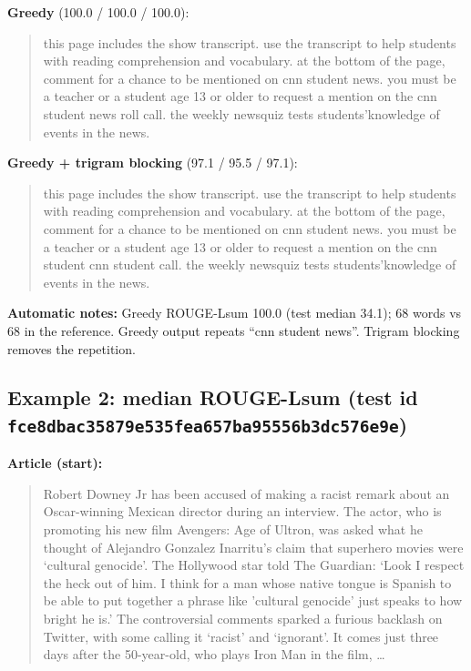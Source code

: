 \documentclass[10pt,a4paper]{article}
\begin{document}
\textbf{Greedy} (100.0 / 100.0 / 100.0):

\begin{quote}
this page includes the show transcript.
use the transcript to help students with reading comprehension and vocabulary.
at the bottom of the page, comment for a chance to be mentioned on cnn student news. you must be a teacher or a student age 13 or older to request a mention on the cnn student news roll call.
the weekly newsquiz tests students'knowledge of events in the news.
\end{quote}

\textbf{Greedy + trigram blocking} (97.1 / 95.5 / 97.1):

\begin{quote}
this page includes the show transcript.
use the transcript to help students with reading comprehension and vocabulary.
at the bottom of the page, comment for a chance to be mentioned on cnn student news. you must be a teacher or a student age 13 or older to request a mention on the cnn student cnn student call.
the weekly newsquiz tests students'knowledge of events in the news.
\end{quote}

\textbf{Automatic notes:} Greedy ROUGE-Lsum 100.0 (test median 34.1); 68 words vs 68 in the reference. Greedy output repeats ``cnn student news''. Trigram blocking removes the repetition.

\hypertarget{example-2-median-rouge-lsum-test-id-fce8dbac35879e535fea657ba95556b3dc576e9e}{%
\subsection{\texorpdfstring{Example 2: median ROUGE-Lsum (test id \texttt{fce8dbac35879e535fea657ba95556b3dc576e9e})}{Example 2: median ROUGE-Lsum (test id fce8dbac35879e535fea657ba95556b3dc576e9e)}}\label{example-2-median-rouge-lsum-test-id-fce8dbac35879e535fea657ba95556b3dc576e9e}}

\textbf{Article (start):}

\begin{quote}
Robert Downey Jr has been accused of making a racist remark about an Oscar-winning Mexican director during an interview. The actor, who is promoting his new film Avengers: Age of Ultron, was asked what he thought of Alejandro Gonzalez Inarritu's claim that superhero movies were `cultural genocide'. The Hollywood star told The Guardian: `Look I respect the heck out of him. I think for a man whose native tongue is Spanish to be able to put together a phrase like 'cultural genocide' just speaks to how bright he is.' The controversial comments sparked a furious backlash on Twitter, with some calling it `racist' and `ignorant'. It comes just three days after the 50-year-old, who plays Iron Man in the film, \ldots{}
\end{quote}
\end{document}
